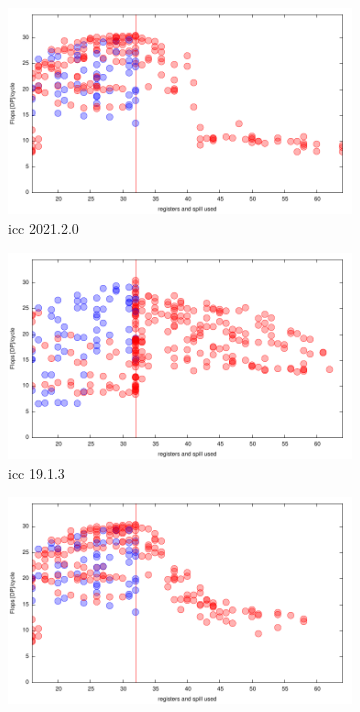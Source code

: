 \documentclass[sigconf,review]{acmart}
\begin{document}
\begin{figure}[ht]
  \begin{subfigure}[h]{0.45\textwidth}
  \includegraphics[width=\textwidth]{../benches/gemm/cascadelake-64x256x64/icc-2021.2.0.pdf}
  \caption{icc 2021.2.0}
  \end{subfigure}
  \begin{subfigure}[h]{0.45\textwidth}  
\includegraphics[width=\textwidth]{../benches/gemm/cascadelake-64x256x64/icc-19.1.3.pdf}
  \caption{icc 19.1.3}
  \end{subfigure}
  \begin{subfigure}[h]{0.45\textwidth}  
\includegraphics[width=\textwidth]{../benches/gemm/cascadelake-64x256x64/pbqp.pdf}

\end{subfigure}
\end{figure}
\end{document}
